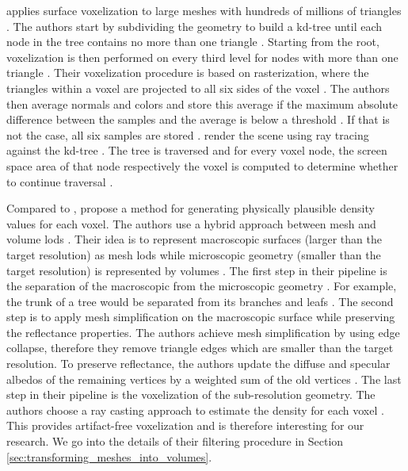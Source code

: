 \citeauthor{afra_voxel_lods} applies surface voxelization to large meshes with hundreds of millions of triangles \cite{afra_voxel_lods}.
The authors start by subdividing the geometry to build a kd-tree until each node in the tree contains no more than one triangle \cite{afra_voxel_lods}.
Starting from the root, voxelization is then performed on every third level for nodes with more than one triangle \cite{afra_voxel_lods}.
Their voxelization procedure is based on rasterization, where the triangles within a voxel are projected to all six sides of the voxel \cite{afra_voxel_lods}.
The authors then average normals and colors and store this average if the maximum absolute difference between the samples and the average is below a threshold \cite{afra_voxel_lods}.
If that is not the case, all six samples are stored \cite{afra_voxel_lods}.
\citeauthor{afra_voxel_lods} render the scene using ray tracing against the kd-tree \cite{afra_voxel_lods}.
The tree is traversed and for every voxel node, the screen space area of that node respectively the voxel is computed to determine whether to continue traversal \cite{afra_voxel_lods}.

Compared to \citeauthor{afra_voxel_lods}, \citeauthor{hybrid_mesh_volume_lods} propose a method for generating physically plausible density values for each voxel.
The authors use a hybrid approach between mesh and volume \acp{lod} \cite{hybrid_mesh_volume_lods}.
Their idea is to represent macroscopic surfaces (larger than the target resolution) as mesh \acsp{lod} while microscopic geometry (smaller than the target resolution) is represented by volumes \cite{hybrid_mesh_volume_lods}.
The first step in their pipeline is the separation of the macroscopic from the microscopic geometry \cite{hybrid_mesh_volume_lods}.
For example, the trunk of a tree would be separated from its branches and leafs \cite{hybrid_mesh_volume_lods}.
The second step is to apply mesh simplification on the macroscopic surface while preserving the reflectance properties.
The authors achieve mesh simplification by using edge collapse, therefore they remove triangle edges which are smaller than the target resolution.
To preserve reflectance, the authors update the diffuse and specular albedos of the remaining vertices by a weighted sum of the old vertices \cite{hybrid_mesh_volume_lods}.
The last step in their pipeline is the voxelization of the sub-resolution geometry.
The authors choose a ray casting approach to estimate the density for each voxel \cite{hybrid_mesh_volume_lods}.
This provides artifact-free voxelization and is therefore interesting for our research.
We go into the details of their filtering procedure in Section \ref{sec:transforming_meshes_into_volumes}.





